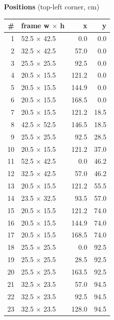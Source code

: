 \documentclass[a4paper,landscape,10pt]{article}
\begin{document}
\begin{minipage}[t]{0.25\textwidth}
\vspace{8pt}
{\bfseries Positions} (top-left corner, cm)\\[2pt]
\tiny
\begin{tabular}{@{}r l r r@{}}
\toprule
\# & frame w $\times$ h & x & y \\
\midrule
1 & 52.5 $\times$ 42.5 & 0.0 & 0.0 \\
2 & 32.5 $\times$ 42.5 & 57.0 & 0.0 \\
3 & 25.5 $\times$ 25.5 & 92.5 & 0.0 \\
4 & 20.5 $\times$ 15.5 & 121.2 & 0.0 \\
5 & 20.5 $\times$ 15.5 & 144.9 & 0.0 \\
6 & 20.5 $\times$ 15.5 & 168.5 & 0.0 \\
7 & 20.5 $\times$ 15.5 & 121.2 & 18.5 \\
8 & 42.5 $\times$ 52.5 & 146.5 & 18.5 \\
9 & 25.5 $\times$ 25.5 & 92.5 & 28.5 \\
10 & 20.5 $\times$ 15.5 & 121.2 & 37.0 \\
11 & 52.5 $\times$ 42.5 & 0.0 & 46.2 \\
12 & 32.5 $\times$ 42.5 & 57.0 & 46.2 \\
13 & 20.5 $\times$ 15.5 & 121.2 & 55.5 \\
14 & 23.5 $\times$ 32.5 & 93.5 & 57.0 \\
15 & 20.5 $\times$ 15.5 & 121.2 & 74.0 \\
16 & 20.5 $\times$ 15.5 & 144.9 & 74.0 \\
17 & 20.5 $\times$ 15.5 & 168.5 & 74.0 \\
18 & 25.5 $\times$ 25.5 & 0.0 & 92.5 \\
19 & 25.5 $\times$ 25.5 & 28.5 & 92.5 \\
20 & 25.5 $\times$ 25.5 & 163.5 & 92.5 \\
21 & 32.5 $\times$ 23.5 & 57.0 & 94.5 \\
22 & 32.5 $\times$ 23.5 & 92.5 & 94.5 \\
23 & 32.5 $\times$ 23.5 & 128.0 & 94.5 \\
\bottomrule
\end{tabular}
\end{minipage}
\clearpage
\end{document}

